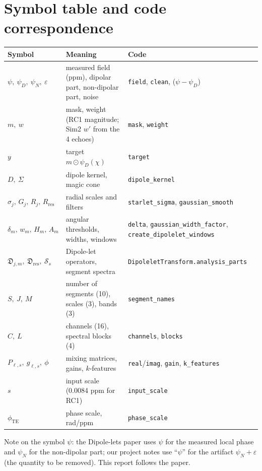 \documentclass[11pt]{article}
\newcommand{\md}{\mathfrak{D}}
\newcommand{\code}[1]{\texttt{#1}}
\theoremstyle{remark}
\begin{document}
\appendix
\section{Symbol table and code correspondence}
\begin{table}[h]
\centering\small
\begin{tabular}{@{}p{3.4cm}p{6.0cm}p{6.0cm}@{}}
\toprule
Symbol & Meaning & Code \\
\midrule
$\psi,\ \psi_D,\ \psi_N,\ \varepsilon$ & measured field (ppm), dipolar part, non-dipolar part, noise & \code{field}, \code{clean}, ($\psi-\psi_D$) \\
$m,\ w$ & mask, weight (RC1 magnitude; Sim2 $w'$ from the 4 echoes) & \code{mask}, \code{weight} \\
$y$ & target $m\odot\psi_D(\chi)$ & \code{target} \\
$D,\ \Sigma$ & dipole kernel, magic cone & \code{dipole\_kernel} \\
$\sigma_j,\,G_j,\,R_j,\,R_{\mathrm{res}}$ & radial scales and filters & \code{starlet\_sigma}, \code{gaussian\_smooth} \\
$\delta_m,\,w_m,\,H_m,\,A_m$ & angular thresholds, widths, windows & \code{delta}, \code{gaussian\_width\_factor}, \code{create\_dipolelet\_windows} \\
$\md_{j,m},\ \md_{\mathrm{res}},\ \mathcal S_s$ & Dipole-let operators, segment spectra & \code{DipoleletTransform.analysis\_parts} \\
$S,\ J,\ M$ & number of segments (10), scales (3), bands (3) & \code{segment\_names} \\
$C,\ L$ & channels (16), spectral blocks (4) & \code{channels}, \code{blocks} \\
$P_{\ell,s},\ g_{\ell,s},\ \phi$ & mixing matrices, gains, $k$-features & \code{real}/\code{imag}, \code{gain}, \code{k\_features} \\
$s$ & input scale (0.0084 ppm for RC1) & \code{input\_scale} \\
$\phi_{\mathrm{TE}}$ & phase scale, rad/ppm & \code{phase\_scale} \\
\bottomrule
\end{tabular}
\end{table}
Note on the symbol $\psi$: the Dipole-lets paper uses $\psi$ for the measured local phase and $\psi_N$ for the non-dipolar part; our project notes use ``$\psi$'' for the artifact $\psi_N+\varepsilon$ (the quantity to be removed). This report follows the paper.
\end{document}
